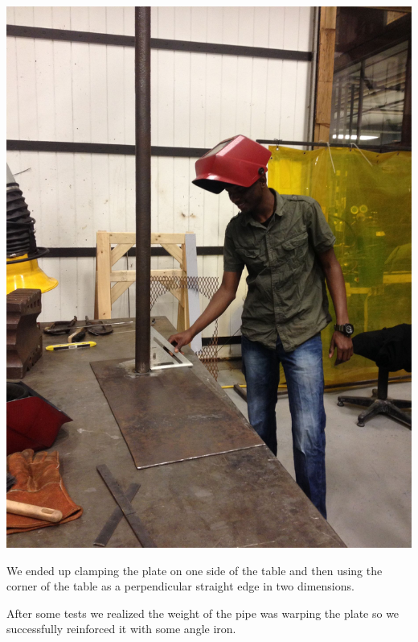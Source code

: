 \documentclass[11pt]{article} %
\begin{document}
\begin{center}
\includegraphics[scale=0.12]{roofmount/05.jpeg}
\end{center}


We ended up clamping the plate on one side of the table and then using the corner of the table as a perpendicular straight edge in two dimensions.

After some tests we realized the weight of the pipe was warping the plate so we successfully reinforced it with some angle iron.
\end{document}
